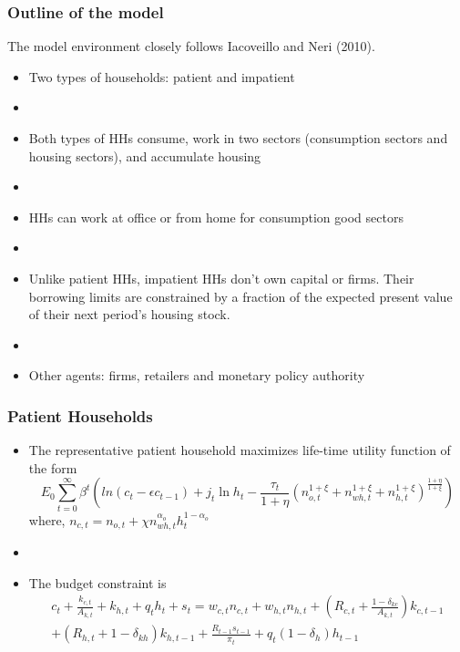 \documentclass[blue]{beamer}
\begin{document}
\begin{frame} \frametitle{Outline of the model}

The model environment closely follows Iacoveillo and Neri (2010).
\begin{itemize}
\item Two types of households: patient and impatient
\item []
\item Both types of HHs consume, work in two sectors (consumption sectors and housing sectors), and accumulate housing
\item []
\item HHs can work at office or from home for consumption good sectors
\item []
\item Unlike patient HHs, impatient HHs don't own capital or firms. Their borrowing limits are constrained by a fraction of the expected present value of their next period's housing stock.
\item []
\item Other agents:  firms,  retailers and monetary policy authority
              \end{itemize}
          \end{frame}
         

\begin{frame} \frametitle{Patient Households}
\small
\begin{itemize}
\item The representative patient household maximizes  life-time utility function of the form 
\[
		E_0 \sum_{t=0}^{\infty} \beta^t  \left(ln(c_t-\epsilon c_{t-1}) + j_t \ln h_t - \frac{\tau_t}{1+\eta} (n_{o,t}^{1+\xi}+ n_{wh,t}^{1+\xi}  + n_{h,t}^{1+\xi} ) ^{\frac{1+\eta}{1+\xi}} \right)
\]
where, 
${n_{c,t} = n_{o,t} + \chi n_{wh,t}^{\alpha_o} h_t^{1-\alpha_o} } $

\item []
\item The budget constraint is
\begin{multline} \label{eq:patient_hh_BC}
	c_t + \frac{k_{c,t}}{A_{k,t}} + k_{h,t}  + q_t h_t + s_t = w_{c,t}n_{c,t} + w_{h,t}n_{h,t}+(R_{c,t}  + \frac{1-\delta_{kc}}{A_{k,t}})k_{c,t-1}\\ +  \left(R_{h,t}+1-\delta_{kh}\right)k_{h,t-1} + \frac{R_{t-1}s_{t-1}}{\pi_t} 
		 + q_t (1-\delta_h) h_{t-1} 
	\end{multline}
\end{itemize}
\end{frame}
\end{document}
